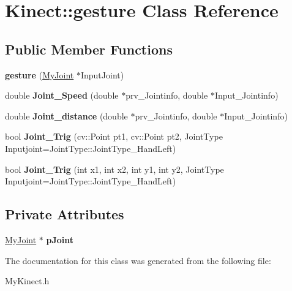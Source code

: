 \hypertarget{class_kinect_1_1gesture}{}\section{Kinect\+:\+:gesture Class Reference}
\label{class_kinect_1_1gesture}
\subsection*{Public Member Functions}
\begin{DoxyCompactItemize}
\item 
\mbox{\label{class_kinect_1_1gesture_ae483ba9251b88dd45becebd39ec4b910}} 
{\bfseries gesture} (\hyperlink{class_kinect_1_1_my_joint}{My\+Joint} $\ast$Input\+Joint)
\item 
\mbox{\label{class_kinect_1_1gesture_a38f8ba4002d5254b2bc3c6f71a8197d9}} 
double {\bfseries Joint\+\_\+\+Speed} (double $\ast$prv\+\_\+\+Jointinfo, double $\ast$Input\+\_\+\+Jointinfo)
\item 
\mbox{\label{class_kinect_1_1gesture_ac2e050ac39ee542ea8d6bc9d24abbcf5}} 
double {\bfseries Joint\+\_\+distance} (double $\ast$prv\+\_\+\+Jointinfo, double $\ast$Input\+\_\+\+Jointinfo)
\item 
\mbox{\label{class_kinect_1_1gesture_a5b55f140c03140ec46fd0aa04a026cfd}} 
bool {\bfseries Joint\+\_\+\+Trig} (cv\+::\+Point pt1, cv\+::\+Point pt2, Joint\+Type Inputjoint=Joint\+Type\+::\+Joint\+Type\+\_\+\+Hand\+Left)
\item 
\mbox{\label{class_kinect_1_1gesture_a22e650e2ffe34276a5007a6526fa16b3}} 
bool {\bfseries Joint\+\_\+\+Trig} (int x1, int x2, int y1, int y2, Joint\+Type Inputjoint=Joint\+Type\+::\+Joint\+Type\+\_\+\+Hand\+Left)
\end{DoxyCompactItemize}
\subsection*{Private Attributes}
\begin{DoxyCompactItemize}
\item 
\mbox{\label{class_kinect_1_1gesture_a1cf2e35610008269d94ac1fa7c40f282}} 
\hyperlink{class_kinect_1_1_my_joint}{My\+Joint} $\ast$ {\bfseries p\+Joint}
\end{DoxyCompactItemize}


The documentation for this class was generated from the following file\+:\begin{DoxyCompactItemize}
\item 
My\+Kinect.\+h\end{DoxyCompactItemize}
